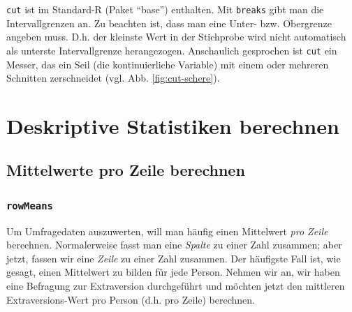 \documentclass[12pt,ngerman,]{book}
\newenvironment{Shaded}{\begin{snugshade}}{\end{snugshade}}
\newcommand{\KeywordTok}[1]{\textcolor[rgb]{0.13,0.29,0.53}{\textbf{{#1}}}}
\newcommand{\StringTok}[1]{\textcolor[rgb]{0.31,0.60,0.02}{{#1}}}
\newcommand{\CommentTok}[1]{\textcolor[rgb]{0.56,0.35,0.01}{\textit{{#1}}}}
\newcommand{\NormalTok}[1]{{#1}}
\renewenvironment{Shaded}{\begin{kframe}}{\end{kframe}}
\begin{document}
\texttt{cut} ist im Standard-R (Paket ``base'') enthalten. Mit
\texttt{breaks} gibt man die Intervallgrenzen an. Zu beachten ist, dass
man eine Unter- bzw. Obergrenze angeben muss. D.h. der kleinste Wert in
der Stichprobe wird nicht automatisch als unterste Intervallgrenze
herangezogen. Anschaulich gesprochen ist \texttt{cut} ein Messer, das
ein Seil (die kontinuierliche Variable) mit einem oder mehreren
Schnitten zerschneidet (vgl. Abb. \ref{fig:cut-schere}).

\section{Deskriptive Statistiken
berechnen}\label{deskriptive-statistiken-berechnen}

\subsection{Mittelwerte pro Zeile
berechnen}\label{mittelwerte-pro-zeile-berechnen}

\subsubsection{\texorpdfstring{\texttt{rowMeans}}{rowMeans}}\label{rowmeans}

Um Umfragedaten auszuwerten, will man häufig einen Mittelwert \emph{pro
Zeile} berechnen. Normalerweise fasst man eine \emph{Spalte} zu einer
Zahl zusammen; aber jetzt, fassen wir eine \emph{Zeile} zu einer Zahl
zusammen. Der häufigste Fall ist, wie gesagt, einen Mittelwert zu bilden
für jede Person. Nehmen wir an, wir haben eine Befragung zur
Extraversion durchgeführt und möchten jetzt den mittleren
Extraversions-Wert pro Person (d.h. pro Zeile) berechnen.

\begin{Shaded}
\end{Shaded}
\end{document}
